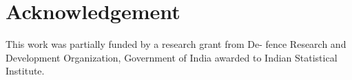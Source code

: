 \section{Acknowledgement}
This work was partially funded by a research grant from De-
fence Research and Development Organization, Government 
of India awarded to Indian Statistical Institute.